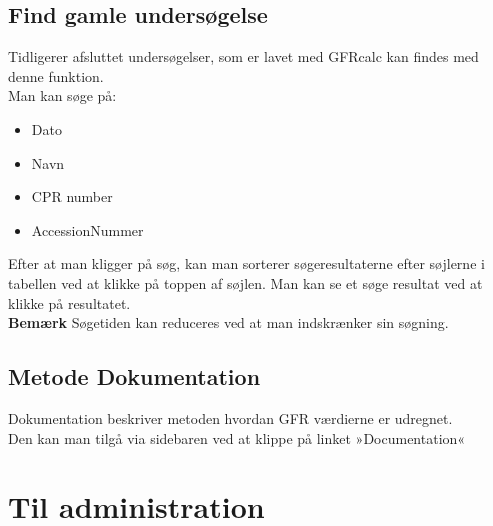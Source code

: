 \documentclass{article}
\begin{document}
\subsection{Find gamle undersøgelse}\label{search}
Tidligerer afsluttet undersøgelser, som er lavet med GFRcalc kan findes med denne funktion.\\
Man kan søge på:
\begin{itemize}
	\item Dato
	\item Navn
	\item CPR number
	\item AccessionNummer 
\end{itemize}
Efter at man kligger på søg, kan man sorterer søgeresultaterne efter søjlerne i tabellen ved at klikke på toppen af søjlen. Man kan se et søge resultat ved at klikke på resultatet.\\
\textbf{Bemærk} Søgetiden kan reduceres ved at man indskrænker sin søgning. 



\subsection{Metode Dokumentation}\label{Documentation}
Dokumentation beskriver metoden hvordan GFR værdierne er udregnet.\\ 
Den kan man tilgå via sidebaren ved at klippe på linket »Documentation«
\newpage
\section{Til administration}
\end{document}
